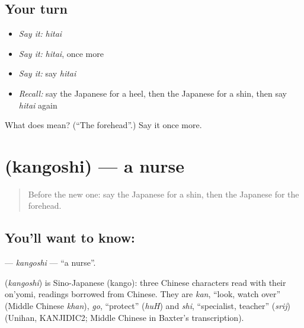 \subsection*{Your turn}
\begin{itemize}
\raggedright
  \item \emph{Say it:} \emph{hitai}
  \item \emph{Say it:} \emph{hitai}, once more
  \item \emph{Say it:} say \emph{hitai}
  \item \emph{Recall:} say the Japanese for a heel, then the Japanese for a shin, then say \emph{hitai} again
\end{itemize}

\begin{tcolorbox}[breakable,colback=teal!4,colframe=teal!35!black,title={Before you move on}]
What does  mean? (\textquotedblleft{}The forehead\textquotedblright{}.) Say it once more.
\end{tcolorbox}
\section[\texorpdfstring{\ja{かんごし} (kangoshi)}{かんごし (kangoshi)}]{ (kangoshi) — a nurse}

\label{lesson:JA-C111-kangoshi}



\begin{quote}
Before the new one: say the Japanese for a shin, then the Japanese for the forehead.
\end{quote}

\subsection*{You'll want to know: }
\textbf{} — \emph{kangoshi} — \textquotedblleft{}a nurse\textquotedblright{}.

\begin{cousinweb}
\textbf{} (\emph{kangoshi}) is Sino-Japanese (kango): three Chinese characters read with their on'yomi, readings borrowed from Chinese. They are \emph{kan}, \textquotedblleft{}look, watch over\textquotedblright{} (Middle Chinese \emph{khan}), \emph{go}, \textquotedblleft{}protect\textquotedblright{} (\emph{huH}) and \emph{shi}, \textquotedblleft{}specialist, teacher\textquotedblright{} (\emph{srij}) (Unihan, KANJIDIC2; Middle Chinese in Baxter's transcription).
\end{cousinweb}

